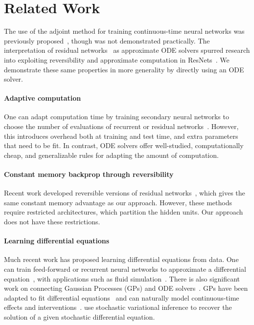 \documentclass{article}
\begin{document}
\section{Related Work}
The use of the adjoint method for training continuous-time neural networks was previously proposed~\citep{lecun1988theoretical, pearlmutter1995gradient}, though was not demonstrated practically.
The interpretation of residual networks~\cite{he2016deep} as approximate ODE solvers spurred research into exploiting reversibility and approximate computation in ResNets~\citep{chang2017reversible, lu2017beyond}.
We demonstrate these same properties in more generality by directly using an ODE solver.

\paragraph{Adaptive computation}
One can adapt computation time by training secondary neural networks to choose the number of evaluations of recurrent or residual networks~\citep{graves2016adaptive, jernite2016variable, figurnov2017spatially,chang2018multilevel}.
However, this introduces overhead both at training and test time, and extra parameters that need to be fit.
In contrast, ODE solvers offer well-studied, computationally cheap, and generalizable rules for adapting the amount of computation.

\paragraph{Constant memory backprop through reversibility}
Recent work developed reversible versions of residual networks~\citep{gomez2017reversible, haber2017stable, chang2017reversible}, which gives the same constant memory advantage as our approach.
However, these methods require restricted architectures, which partition the hidden units. %
Our approach does not have these restrictions.

\paragraph{Learning differential equations}
Much recent work has proposed learning differential equations from data.
One can train feed-forward or recurrent neural networks to approximate a differential equation~\citep{2018Raissi,raissi2018multistep,2017PDEnetfromData}, with applications such as fluid simulation~\citep{wiewel2018latent}.
There is also significant work on connecting Gaussian Processes (GPs) and ODE solvers~\citep{SchoDuvHen2014ode}.
GPs have been adapted to fit differential equations~\citep{raissi2018numerical} and can naturally model continuous-time effects and interventions~\citep{soleimani2017treatment,schulam2017if}.
\citet{2018blackboxSVIforSDE} use stochastic variational inference to recover the solution of a given stochastic differential equation.
\end{document}
